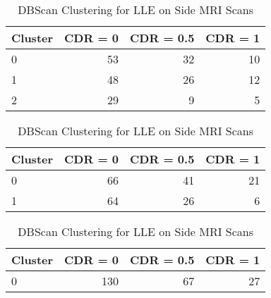 \begin{table}[h] \centering
\begin{minipage}{0.3\textwidth}

\begin{tabular}{lrrr}
\toprule
Cluster & CDR = 0 & CDR = 0.5 & CDR = 1\\
\midrule
0 & 53 & 32 & 10\\
1 & 48 & 26 & 12\\
2 & 29 & 9 & 5\\
\bottomrule
\end{tabular}
\caption{Kmeans Clustering with 3 Clusters for LLE on Side MRI Scans}
\end{minipage}
\hspace{3cm}
\begin{minipage}{0.3\textwidth}

\begin{tabular}{lrrr}
\toprule
Cluster & CDR = 0 & CDR = 0.5 & CDR = 1\\
\midrule
0 & 66 & 41 & 21\\
1 & 64 & 26 & 6\\
\bottomrule
\end{tabular}
\caption{Kmeans Clustering with 2 Clusters for LLE on Side MRI Scans}
\end{minipage}
\hspace{3cm}
\begin{minipage}{0.3\textwidth}

\begin{tabular}{lrrr}
\toprule
Cluster & CDR = 0 & CDR = 0.5 & CDR = 1\\
\midrule
0 & 130 & 67 & 27\\
\bottomrule
\end{tabular}
\caption{DBScan Clustering for LLE on Side MRI Scans}
\end{minipage}
\end{table}
